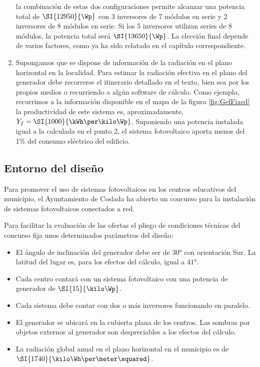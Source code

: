 \begin{enumerate}
la combinación de estas dos configuraciones permite alcanzar una potencia
total de $\SI{12950}{\Wp}$ con 3 inversores de 7 módulos en
serie y 2 inversores de 8 módulos en serie. Si los 5 inversores utilizan
series de 8 módulos, la potencia total será $\SI{13650}{\Wp}$.
La elección final depende de varios factores, como ya ha sido relatado
en el capítulo correspondiente.
\item Supongamos que se dispone de información de la radiación en el plano
horizontal en la localidad. Para estimar la radiación efectiva en
el plano del generador debe recorrerse el itinerario detallado en el texto, bien sea por los propios
medios o recurriendo a algún software de cálculo. Como ejemplo, recurrimos
a la información disponible en el mapa de la figura \ref{fig:GefFixed}
la productividad de este sistema es, aproximadamente, $Y_{f}=\SI{1000}{\kWh\per\kilo\Wp}$.
Suponiendo una potencia instalada igual a la calculada en el punto
2, el sistema fotovoltaico aporta menos del 1\% del consumo eléctrico
del edificio.

\end{enumerate}

\clearpage{}

\subsection{Entorno del diseño}

Para promover el uso de sistemas fotovoltaicos en los centros
educativos del municipio, el Ayuntamiento de Coslada ha abierto un
concurso para la instalación de sistemas fotovoltaicos conectados a
red.

Para facilitar la evaluación de las ofertas el pliego de condiciones
técnicas del concurso fija unos determinados parámetros del diseño:
\begin{itemize}
\item El ángulo de inclinación del generador debe ser de $\ang{30}$
  con orientación Sur. La latitud del lugar es, para los efectos del
  cálculo, igual a $\ang{41}$.
\item Cada centro contará con un sistema fotovoltaico con una potencia
  de generador de $\SI{15}{\kilo\Wp}$.
\item Cada sistema debe contar con dos o más inversores funcionando en
  paralelo.
\item El generador se ubicará en la cubierta plana de los centros. Las
  sombras por objetos externos al generador son despreciables a los
  efectos del cálculo.
\item La radiación global anual en el plano horizontal en el municipio
  es de $\SI{1740}{\kilo\Wh\per\meter\squared}$.
\end{itemize}

